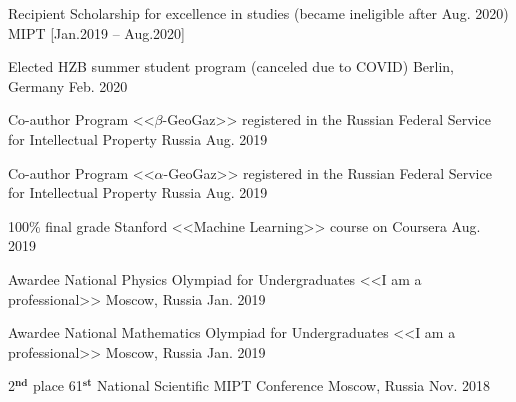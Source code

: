 
\begin{cvhonors}

  \cvhonor
    {Recipient} %
    {Scholarship for excellence in studies (became ineligible after Aug. 2020)} %
    {MIPT} %
    {[Jan.2019 -- Aug.2020]} %
        
  \cvhonor
    {Elected} %
    {HZB summer student program (canceled due to COVID)} %
    {Berlin, Germany} %
    {Feb. 2020} %
    
  \cvhonor
    {Co-author} %
    {Program <<$\beta$-GeoGaz>> registered in the Russian Federal Service for Intellectual Property} %
    {Russia} %
    {Aug. 2019} %
            
  \cvhonor
    {Co-author} %
    {Program <<$\alpha$-GeoGaz>> registered in the Russian Federal Service for Intellectual Property} %
    {Russia} %
    {Aug. 2019} %
    
  \cvhonor
    {100\% final grade} %
    {Stanford <<Machine Learning>> course on Coursera} %
    {} %
    {Aug. 2019} %
    
  \cvhonor
    {Awardee} %
    {National Physics Olympiad for Undergraduates <<I am a professional>>} %
    {Moscow, Russia} %
    {Jan. 2019} %
    
    
  \cvhonor
    {Awardee} %
    {National Mathematics Olympiad for Undergraduates <<I am a professional>>} %
    {Moscow, Russia} %
    {Jan. 2019} %
    
  \cvhonor
    {2$^{\textbf{nd}}$ place} %
    {61$^{\textbf{st}}$ National Scientific MIPT Conference} %
    {Moscow, Russia} %
    {Nov. 2018} %
    

\end{cvhonors}
